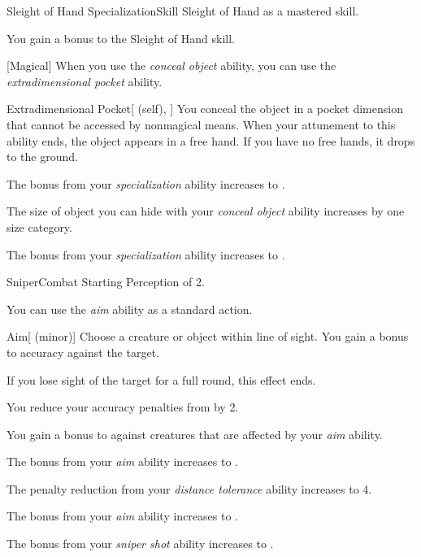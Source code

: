     \begin{feat}{Sleight of Hand Specialization}{Skill}
        \featpre Sleight of Hand as a mastered skill.

         You gain a  bonus to the Sleight of Hand skill.


        [Magical] When you use the \textit{conceal object} ability, you can use the \textit{extradimensional pocket} ability.
        \begin{attuneability}{Extradimensional Pocket}[ (self), ]
            You conceal the object in a pocket dimension that cannot be accessed by nonmagical means.
            When your attunement to this ability ends, the object appears in a free hand.
            If you have no free hands, it drops to the ground.
        \end{attuneability}

         The bonus from your \textit{specialization} ability increases to .

         The size of object you can hide with your \textit{conceal object} ability increases by one size category.

         The bonus from your \textit{specialization} ability increases to .

    \end{feat}

    \begin{feat}{Sniper}{Combat}
        \featpre Starting Perception of 2.

         You can use the \textit{aim} ability as a standard action.
        \begin{freeability}{Aim}[ (minor)]
            Choose a creature or object within line of sight.
            You gain a  bonus to accuracy against the target.

            If you lose sight of the target for a full round, this effect ends.
        \end{freeability}

         You reduce your accuracy penalties from  by 2.

         You gain a  bonus to  against \unaware creatures that are affected by your \textit{aim} ability.

         The bonus from your \textit{aim} ability increases to .

         The penalty reduction from your \textit{distance tolerance} ability increases to 4.

         The bonus from your \textit{aim} ability increases to .

         The bonus from your \textit{sniper shot} ability increases to .
    \end{feat}


